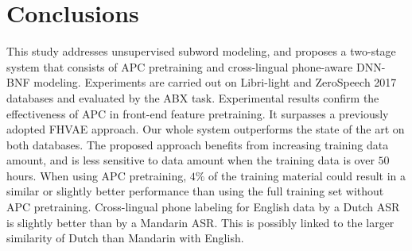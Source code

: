 \documentclass[a4paper]{article}
\begin{document}

\section{Conclusions}
This study addresses unsupervised subword modeling, and proposes a two-stage system that consists of APC pretraining and cross-lingual phone-aware DNN-BNF modeling.  
Experiments are carried out on Libri-light and ZeroSpeech 2017 databases and evaluated by the ABX task. Experimental results confirm the effectiveness of APC in front-end feature pretraining. It surpasses a previously adopted FHVAE approach. Our whole system outperforms the state of the art on both databases. The proposed approach benefits from increasing training data amount, and is less sensitive to data amount when the training data is over $50$ hours. 
{\color{blue}When using APC pretraining, $4\%$ of the training material could result in a similar  or slightly better  performance than   using the full training set without  APC pretraining.}
Cross-lingual phone labeling for English data by a Dutch ASR is slightly better than by a Mandarin ASR. This is possibly linked to the larger similarity of Dutch than Mandarin with  English.  









\end{document}
